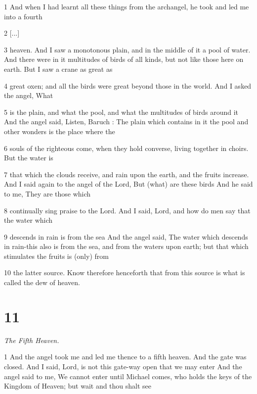 \par 1 And when I had learnt all these things from the archangel, he took and led me into a fourth

\par 2 [...]

\par 3 heaven. And I saw a monotonous plain, and in the middle of it a pool of water. And there were in it multitudes of birds of all kinds, but not like those here on earth. But I saw a crane as great as

\par 4 great oxen; and all the birds were great beyond those in the world. And I asked the angel, What

\par 5 is the plain, and what the pool, and what the multitudes of birds around it And the angel said, Listen, Baruch : The plain which contains in it the pool and other wonders is the place where the

\par 6 souls of the righteous come, when they hold converse, living together in choirs. But the water is

\par 7 that which the clouds receive, and rain upon the earth, and the fruits increase. And I said again to the angel of the Lord, But (what) are these birds And he said to me, They are those which

\par 8 continually sing praise to the Lord. And I said, Lord, and how do men say that the water which

\par 9 descends in rain is from the sea And the angel said, The water which descends in rain-this also is from the sea, and from the waters upon earth; but that which stimulates the fruits is (only) from

\par 10 the latter source. Know therefore henceforth that from this source is what is called the dew of heaven.

\chapter{11}

\par \textit{The Fifth Heaven.}

\par 1 And the angel took me and led me thence to a fifth heaven. And the gate was closed. And I said, Lord, is not this gate-way open that we may enter And the angel said to me, We cannot enter until Michael comes, who holds the keys of the Kingdom of Heaven; but wait and thou shalt see

